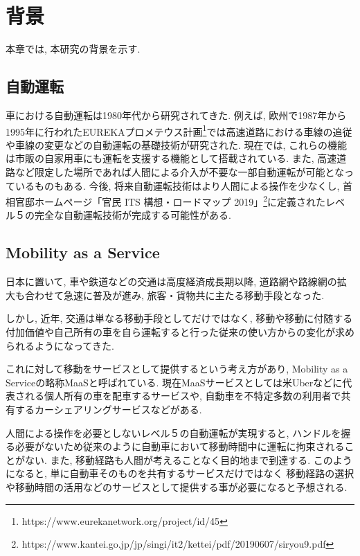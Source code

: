 \chapter{背景}
\label{background}



本章では, 本研究の背景を示す.

\section{自動運転}

車における自動運転は1980年代から研究されてきた.
例えば, 欧州で1987年から1995年に行われたEUREKAプロメテウス計画\footnote[1]{https://www.eurekanetwork.org/project/id/45}では高速道路における車線の追従や車線の変更などの自動運転の基礎技術が研究された.
現在では, これらの機能は市販の自家用車にも運転を支援する機能として搭載されている. また, 高速道路など限定した場所であれば人間による介入が不要な一部自動運転が可能となっているものもある.
今後, 将来自動運転技術はより人間による操作を少なくし, 首相官邸ホームページ「官民 ITS 構想・ロードマップ 2019」\footnote[2]{https://www.kantei.go.jp/jp/singi/it2/kettei/pdf/20190607/siryou9.pdf}に定義されたレベル５の完全な自動運転技術が完成する可能性がある.



\section{Mobility as a Service}

日本に置いて, 車や鉄道などの交通は高度経済成長期以降, 道路網や路線網の拡大も合わせて急速に普及が進み, 旅客・貨物共に主たる移動手段となった. 

しかし, 近年, 交通は単なる移動手段としてだけではなく, 移動や移動に付随する付加価値や自己所有の車を自ら運転すると行った従来の使い方からの変化が求められるようになってきた.

これに対して移動をサービスとして提供するという考え方があり, Mobility as a Serviceの略称MaaSと呼ばれている. 現在MaaSサービスとしては米Uberなどに代表される個人所有の車を配車するサービスや, 自動車を不特定多数の利用者で共有するカーシェアリングサービスなどがある.

人間による操作を必要としないレベル５の自動運転が実現すると, ハンドルを握る必要がないため従来のように自動車において移動時間中に運転に拘束されることがない.
また, 移動経路も人間が考えることなく目的地まで到達する. このようになると, 単に自動車そのものを共有するサービスだけではなく
移動経路の選択や移動時間の活用などのサービスとして提供する事が必要になると予想される.

